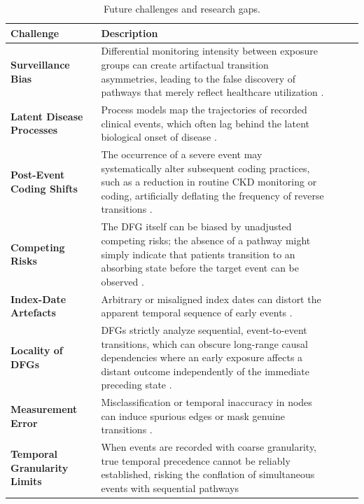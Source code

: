 \documentclass[sn-vancouver-num]{sn-jnl}
\begin{document}
\begin{table}[h]
\caption{Future challenges and research gaps.}
\label{tab:limitations}
\centering
\scriptsize
\setlength{\tabcolsep}{4pt}
\renewcommand{\arraystretch}{1.18}
\begin{tabularx}{\textwidth}{@{}>{\raggedright\arraybackslash}p{2.4cm}YYYY@{}}
\toprule
\textbf{Challenge} & \textbf{Description}  \\
\midrule
\textbf{Surveillance Bias} & Differential monitoring intensity between exposure groups can create artifactual transition asymmetries, leading to the false discovery of pathways that merely reflect healthcare utilization \citep{uhl2024evaluating}.   \\
\addlinespace[2pt]
\textbf{Latent Disease Processes} & Process models map the trajectories of recorded clinical events, which often lag behind the latent biological onset of disease \citep{harton2022informative}.  \\
\addlinespace[2pt]
\textbf{Post-Event Coding Shifts} & The occurrence of a severe event may systematically alter subsequent coding practices, such as a reduction in routine CKD monitoring or coding, artificially deflating the frequency of reverse transitions \citep{goldstein2019and}. \\
\addlinespace[2pt]
\textbf{Competing Risks} & The DFG itself can be biased by unadjusted competing risks; the absence of a pathway might simply indicate that patients transition to an absorbing state before the target event can be observed \citep{mollenhoff2024testing}. \\
\addlinespace[2pt]
\textbf{Index-Date Artefacts} & Arbitrary or misaligned index dates can distort the apparent temporal sequence of early events \citep{swerdel2024comparing}. \\
\addlinespace[2pt]
\textbf{Locality of DFGs} & DFGs strictly analyze sequential, event-to-event transitions, which can obscure long-range causal dependencies where an early exposure affects a distant outcome independently of the immediate preceding state \citep{pan2024untapped}.\\
\addlinespace[2pt]
\textbf{Measurement Error} & Misclassification or temporal inaccuracy in nodes can induce spurious edges or mask genuine transitions \citep{goodwin2022timing}. \\
\addlinespace[2pt]
\textbf{Temporal Granularity Limits} & When events are recorded with coarse granularity, true temporal precedence cannot be reliably established, risking the conflation of simultaneous events with sequential pathways \citep{schuster2024analyzing} \\
\bottomrule
\end{tabularx}
\end{table}
\end{document}
